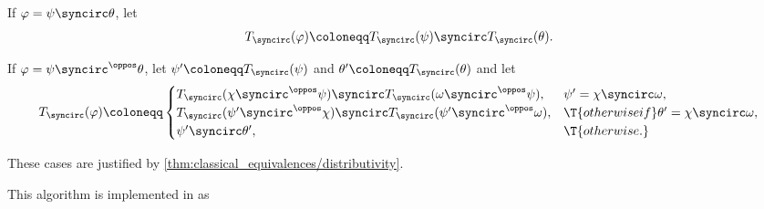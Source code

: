 \begin{algorithm}
\begin{thmenum}
     If \( \varphi = \psi \syncirc \theta \), let
    \begin{equation*}
      T_{\syncirc}(\varphi) \coloneqq T_{\syncirc}(\psi) \syncirc T_{\syncirc}(\theta).
    \end{equation*}

     If \( \varphi = \psi \syncirc^\oppos \theta \), let \( \psi' \coloneqq T_{\syncirc}(\psi) \) and \( \theta' \coloneqq T_{\syncirc}(\theta) \) and let
    \begin{equation*}
      T_{\syncirc}(\varphi) \coloneqq \begin{cases}
        T_{\syncirc}(\chi \syncirc^\oppos \psi) \syncirc T_{\syncirc}(\omega \syncirc^\oppos \psi),   &\psi' = \chi \syncirc \omega, \\
        T_{\syncirc}(\psi' \syncirc^\oppos \chi) \syncirc T_{\syncirc}(\psi' \syncirc^\oppos \omega), &\T{otherwise if} \theta' = \chi \syncirc \omega, \\
        \psi' \syncirc \theta',                                                                           &\T{otherwise.}
      \end{cases}
    \end{equation*}

    These cases are justified by \cref{thm:classical_equivalences/distributivity}.
  \end{thmenum}
\end{algorithm}
\begin{comments}
  \item This algorithm is implemented in \cite{notebook:code} as
  \begin{CodeRefDisplay}
  \end{CodeRefDisplay}
\end{comments}

